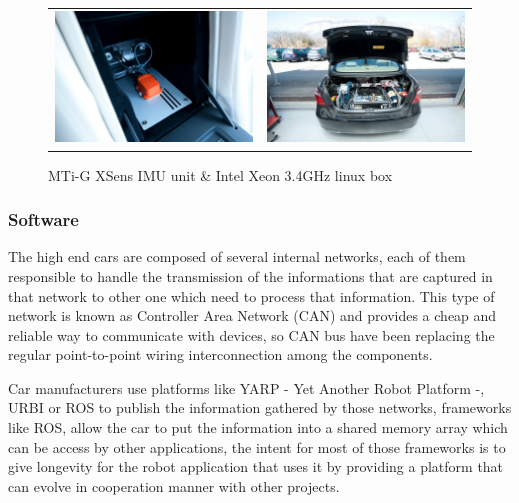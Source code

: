 \begin{figure}[H]
   \centering
     \begin{tabular}{lr}
       \includegraphics[width=0.55\columnwidth]{img/testbed:xsens}
       & \includegraphics[width=0.55\columnwidth]{img/testbed:trunc}
     \end{tabular}
   \caption{MTi-G XSens IMU unit \& Intel Xeon 3.4GHz linux box}
   \label{fig:Lexus}
 \end{figure}


\subsubsection*{Software}

The high end cars are composed of several internal networks, each of them responsible to handle the transmission of the informations that are captured in that network to other one which need to process that information. This type of network is known as Controller Area Network (CAN) and provides a cheap and reliable way to communicate with devices, so CAN bus have been replacing the regular point-to-point wiring interconnection among the components\cite{bosch91can}.

Car manufacturers use platforms like YARP - Yet Another Robot Platform -, URBI or ROS to publish the information gathered by those networks, frameworks like ROS, allow the car to put the information into a shared memory array which can be access by other applications, the intent for most of those frameworks is to give longevity\cite{Fitzpatrick:2008:TLR:1327539.1327705} for the robot application that uses it by providing a platform that can evolve in cooperation manner with other projects.

